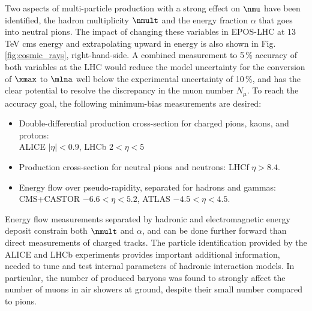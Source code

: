 \documentclass[../report.tex]{subfiles}
\begin{document}


Two aspects of multi-particle production with a strong effect on $\nmu$ have been identified\cite{Ulrich:2010rg}, the hadron multiplicity $\nmult$ and the energy fraction $\alpha$ that goes into neutral pions. The impact of changing these variables in EPOS-LHC at $13$\,TeV cms energy and extrapolating upward in energy is also shown in Fig.\ref{fig:cosmic_rays}, right-hand-side. A combined measurement to 5\,\% accuracy of both variables at the LHC would reduce the model uncertainty for the conversion of $\xmax$ to $\mlna$ well below the experimental uncertainty of 10\,\%, and has the clear potential to resolve the discrepancy in the muon number $N_\mu$. To reach the accuracy goal, the following minimum-bias measurements are desired:
\begin{itemize}
\item Double-differential production cross-section for charged pions, kaons, and protons: \\ ALICE $|\eta| < 0.9$, LHCb $2 < \eta < 5$
\item Production cross-section for neutral pions and neutrons: LHCf $\eta > 8.4$.
\item Energy flow over pseudo-rapidity, separated for hadrons and gammas:\\ CMS+CASTOR $-6.6 < \eta < 5.2$, ATLAS $-4.5 < \eta < 4.5$.
\end{itemize}
Energy flow measurements separated by hadronic and electromagnetic energy deposit constrain both $\nmult$ and $\alpha$, and can be done further forward than direct measurements of charged tracks. The particle identification provided by the ALICE and LHCb experiments provides important additional information, needed to tune and test internal parameters of hadronic interaction models. In particular, the number of produced baryons was found to strongly affect the number of muons in air showers at ground, despite their small number compared to pions\cite{Pierog:2006qv}.
\end{document}
